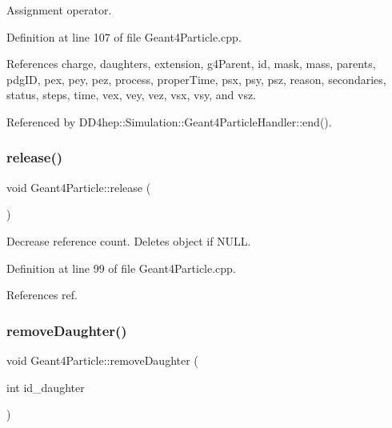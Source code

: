 Assignment operator. 



Definition at line 107 of file Geant4\+Particle.\+cpp.



References charge, daughters, extension, g4\+Parent, id, mask, mass, parents, pdg\+ID, pex, pey, pez, process, proper\+Time, psx, psy, psz, reason, secondaries, status, steps, time, vex, vey, vez, vsx, vsy, and vsz.



Referenced by D\+D4hep\+::\+Simulation\+::\+Geant4\+Particle\+Handler\+::end().

\hypertarget{class_d_d4hep_1_1_simulation_1_1_geant4_particle_a41e9f1e5d735616691cfbf1073e08bd2}{}\label{class_d_d4hep_1_1_simulation_1_1_geant4_particle_a41e9f1e5d735616691cfbf1073e08bd2} 
\subsubsection{\texorpdfstring{release()}{release()}}
{\footnotesize\ttfamily void Geant4\+Particle\+::release (\begin{DoxyParamCaption}{ }\end{DoxyParamCaption})}



Decrease reference count. Deletes object if N\+U\+LL. 



Definition at line 99 of file Geant4\+Particle.\+cpp.



References ref.

\hypertarget{class_d_d4hep_1_1_simulation_1_1_geant4_particle_a2a31cd8bf99c6073484ff0750c38b67c}{}\label{class_d_d4hep_1_1_simulation_1_1_geant4_particle_a2a31cd8bf99c6073484ff0750c38b67c} 
\subsubsection{\texorpdfstring{remove\+Daughter()}{removeDaughter()}}
{\footnotesize\ttfamily void Geant4\+Particle\+::remove\+Daughter (\begin{DoxyParamCaption}\item[{int}]{id\+\_\+daughter }\end{DoxyParamCaption})}



